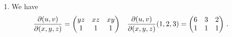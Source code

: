 \begin{solution}
\begin{enumerate}
\item
We have
\begin{align*}
\frac{\partial(u,v)}{\partial(x,y,z)} &=
\begin{pmatrix}
yz & xz & xy \\
1 & 1 & 1
\end{pmatrix} &
\frac{\partial(u,v)}{\partial(x,y,z)}(1, 2, 3) &=
\begin{pmatrix}
6 & 3 & 2 \\
1 & 1 & 1
\end{pmatrix}\,.
\end{align*}
\end{enumerate}
\end{solution}




